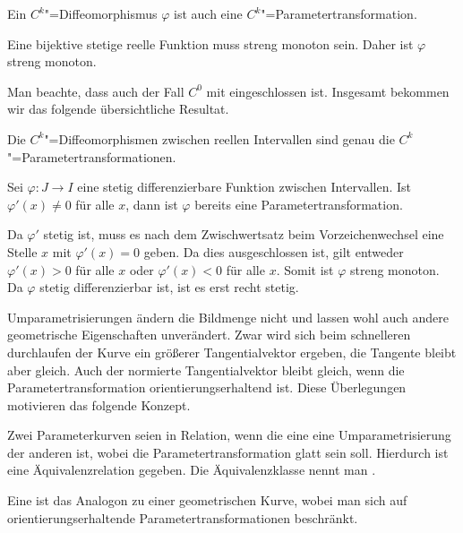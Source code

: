 \begin{corollary}
Ein $C^k$"=Diffeomorphismus $\varphi$ ist auch eine
$C^k$"=Parametertransformation.
\end{corollary}

\noindent{}
Eine bijektive stetige reelle Funktion muss streng monoton sein.
Daher ist $\varphi$ streng monoton.\;\qedsymbol

Man beachte, dass auch der Fall $C^0$ mit eingeschlossen ist.
Insgesamt bekommen wir das folgende übersichtliche Resultat.

\begin{corollary}
Die $C^k$"=Diffeomorphismen zwischen reellen Intervallen sind
genau die $C^k$"=Parametertransformationen.
\end{corollary}

\begin{corollary}
Sei $\varphi\colon J\to I$ eine stetig differenzierbare
Funktion zwischen Intervallen. Ist $\varphi'(x)\ne 0$ für alle $x$,
dann ist $\varphi$ bereits eine Parametertransformation.
\end{corollary}

\noindent{}
Da $\varphi'$ stetig ist, muss es nach dem Zwischwertsatz beim
Vorzeichenwechsel eine Stelle $x$ mit $\varphi'(x)=0$ geben. Da
dies ausgeschlossen ist, gilt entweder $\varphi'(x)>0$ für alle $x$
oder $\varphi'(x)<0$ für alle $x$. Somit ist $\varphi$ streng monoton.
Da $\varphi$ stetig differenzierbar ist, ist es erst recht
stetig.\;\qedsymbol

Umparametrisierungen ändern die Bildmenge nicht und lassen wohl auch
andere geometrische Eigenschaften unverändert. Zwar wird sich
beim schnelleren durchlaufen der Kurve ein größerer Tangentialvektor
ergeben, die Tangente bleibt aber gleich. Auch der normierte
Tangentialvektor bleibt gleich, wenn die Parametertransformation
orientierungserhaltend ist. Diese Überlegungen motivieren das folgende
Konzept.

\begin{definition}
Zwei Parameterkurven seien in Relation, wenn die eine eine
Umparametrisierung der anderen ist, wobei die Parametertransformation
glatt sein soll. Hierdurch ist eine 
Äquivalenzrelation gegeben. Die Äquivalenzklasse nennt man
.
\end{definition}

\begin{definition}
Eine  ist das Analogon zu einer
geometrischen Kurve, wobei man sich auf orientierungserhaltende
Parametertransformationen beschränkt.
\end{definition}

